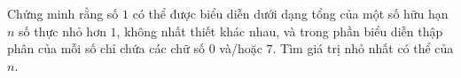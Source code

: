 \ifshowproblem
\begin{problem}\label{example:ROU-2015-JBMO-TST-D5-P1}
    Chứng minh rằng số \(1\) có thể được biểu diễn dưới dạng tổng của một số hữu hạn \(n\) số thực nhỏ hơn \(1\), không nhất thiết khác nhau, 
    và trong phần biểu diễn thập phân của mỗi số chỉ chứa các chữ số \(0\) và/hoặc \(7\). 
    Tìm giá trị nhỏ nhất có thể của \(n\).
\end{problem}
\fi

\footnotemark
{}
\fi